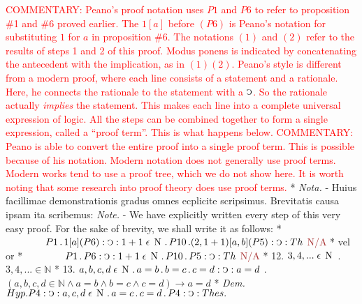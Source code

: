 \documentclass{book}
\newcommand{\C}{\mathop{\sbox0{$\displaystyle$$\reflectbox{C}$} %
\raisebox{-\height+\ht0-0.05cm}[\ht0][\dp0]{\scalebox{0.8}[0.8]{\copy0}}}\displaylimits} %
\newcommand{\p}{\mathop{\sbox0{$\displaystyle$$.$}
\raisebox{-\height+\ht0}[\ht0][\dp0]{\scalebox{1}[1]{\copy0}}}\displaylimits} %
\newcommand{\smallIn}{\ensuremath{\mathrel{\epsilon}}}
\newcommand{\N}{\mathop{\thinspace \text{N} \thinspace}}
\newcommand\commentary[1]{\textcolor{red}{COMMENTARY: #1}}
\newcommand\notPossible{\textcolor{brown}{N/A}}
\newenvironment{translateTwoCol}
               { %
                 \columnratio{0.5, 0.5} \begin{paracol}{2}
                 \newcommand{\LAT}{\switchcolumn[0]*}
                 \newcommand{\ENG}{\switchcolumn[1]}
               }
               { %
                 \let\ENG\undefined
                 \let\LAT\undefined
                 \end{paracol}
               }
\begin{document}
\begin{translateTwoCol}
\vspace{1em}
\commentary{Peano's proof notation uses $P1$ and $P6$ to refer to proposition \#1 and \#6 proved earlier.  The $1[a]$ before $(P6)$ is Peano's notation for substituting $1$ for $a$ in proposition \#6.   The notations $(1)$ and $(2)$ refer to the results of steps 1 and 2 of this proof.  Modus ponens is indicated by concatenating the antecedent with the implication, as in $(1)(2)$.  Peano's style is different from a modern proof, where each line consists of a statement and a rationale.  Here, he connects the rationale to the statement with a $\C$.  So the rationale actually \emph{implies} the statement.  This makes each line into a complete universal expression of logic.  All the steps can be combined together to form a single expression, called a ``proof term''.  This is what happens below.}
\ENG
\commentary{Peano is able to convert the entire proof into a single proof term.  This is possible because of his notation.  Modern notation does not generally use proof terms.  Modern works tend to use a proof tree, which we do not show here.  It is worth noting that some research into proof theory does use proof terms.}
\LAT
\emph{Nota.} - Huius facillimae demonstrationis gradus omnes ecplicite scripsimus. Brevitatis causa ipsam ita scribemus:
\vspace{1em}
\ENG
\vspace{1em}
\emph{Note.} - We have explicitly written every step of this very easy proof. For the sake of brevity, we shall write it as follows:
\vspace{1em}
\LAT
$\hspace{1.4cm} P 1 \p 1 [a] (P 6) : \C : 1 +1 \smallIn \N \p P 10 \p (2, 1+1) [a, b] (P 5) : \C : Th$
\ENG
\notPossible
\LAT
vel
\ENG
or
\LAT
$\hspace{1.4cm} P 1 \p P 6 : \C : 1 + 1 \smallIn \N \p P 10 \p P 5 : \C : Th$
\ENG
\notPossible
\LAT
12. \hspace{0.67cm} $3, 4,... \smallIn \N$
\ENG
12. \hspace{0.67cm} $3, 4, ... \in \mathbb{N}$
\LAT
13. \hspace{0.67cm} $a,b,c,d \smallIn \N \p a = b \p b = c \p c = d : \C : a = d$
\ENG
13. \hspace{0.67cm} $(a,b,c,d \in \mathbb{N} \wedge a = b \wedge b = c \wedge c = d ) \rightarrow a = d$
\LAT
\emph{Dem.} \hspace{0.27cm} $Hyp. P 4 : \C : a,c,d \smallIn \N \p a = c \p c = d \p P4 : \C : Thes.$
\ENG

\end{translateTwoCol}
\end{document}
